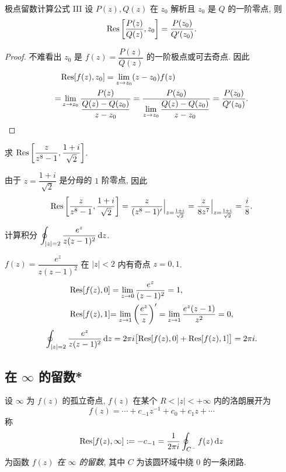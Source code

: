 \begin{second}{极点留数计算公式 III}
	设 $P(z),Q(z)$ 在 $z_0$ 解析且 $z_0$ 是 $Q$ 的一阶零点, 则
	\[{\mathrm{Res}}\left[\frac{P(z)}{Q(z)},z_0\right]=\frac{P(z_0)}{Q'(z_0)}.\]
\end{second}

\begin{proof}
	不难看出 $z_0$ 是 $f(z)=\dfrac{P(z)}{Q(z)}$ 的一阶极点或可去奇点. 因此
	\begin{align*}
			&{\mathrm{Res}}[f(z),z_0]=\lim_{z\to z_0}(z-z_0)f(z)\\
		=&\lim_{z\to z_0}\frac{P(z)}{\dfrac{Q(z)-Q(z_0)}{z-z_0}}
		=\frac{P(z_0)}{\lim\limits_{z\to z_0}\dfrac{Q(z)-Q(z_0)}{z-z_0}}=\frac{P(z_0)}{Q'(z_0)}.\qedhere
	\end{align*}
\end{proof}

\begin{example}
	求 ${\mathrm{Res}}\left[\dfrac{z}{z^8-1},\dfrac{1+i}{\sqrt2}\right]$.
\end{example}

\begin{solution}
		由于 $z=\dfrac{1+i}{\sqrt2}$ 是分母的 $1$ 阶零点,
	{因此
		\[{\mathrm{Res}}\left[\frac z{z^8-1},\frac{1+i}{\sqrt2}\right]
		=\frac z{(z^8-1)'}\Big|_{z=\frac{1+i}{\sqrt2}}
		=\frac z{8z^7}\Big|_{z=\frac{1+i}{\sqrt2}}
		=\frac i8.\]
	}
\end{solution}


\begin{example}
	计算积分 $\displaystyle\oint_{|z|=2}\frac{e^z}{z(z-1)^2}\,\mathrm{d} z$.
\end{example}

\begin{solution}
		$f(z)=\dfrac{e^z}{z(z-1)^2}$ 在 $|z|<2$ 内有奇点 $z=0,1$.
	{\begin{align*}
		{\mathrm{Res}}[f(z),0]&=\lim_{z\to0}\frac{e^z}{(z-1)^2}=1,\\
		{{\mathrm{Res}}[f(z),1]}&{=\lim_{z\to1}\left(\frac{e^z}z\right)'=\lim_{z\to1}\frac{e^z(z-1)}{z^2}=0,}
	\end{align*}\[\oint_{|z|=2}\frac{e^z}{z(z-1)^2}\,\mathrm{d} z
		=2\pi i\bigl[{\mathrm{Res}}[f(z),0]+{\mathrm{Res}}[f(z),1]\bigr]
		=2\pi i.\]
	}
\end{solution}

\subsection{在 \texorpdfstring{$\infty$}{∞} 的留数*}

\begin{definition}
	设 $\infty$ 为 $f(z)$ 的孤立奇点, $f(z)$ 在某个 $R<|z|<+\infty$ 内的洛朗展开为
	\[f(z)=\cdots+c_{-1}z^{-1}+c_0+c_1z+\cdots\]
	称
	\[{\mathrm{Res}}[f(z),\infty]:=-c_{-1}=\frac1{2\pi i}\oint_{C^-}f(z)\,\mathrm{d} z\]
	为函数 \emph{$f(z)$ 在 $\infty$ 的留数}, 其中 $C$ 为该圆环域中绕 $0$ 的一条闭路.
\end{definition}

